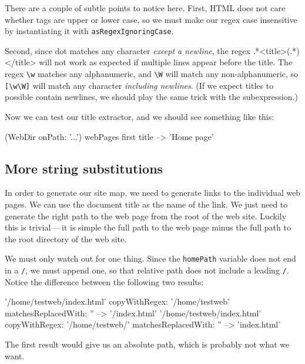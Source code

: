 \documentclass[10pt,twoside,chapterprefix=false]{scrbook}
\newcommand{\highlight}[1]{\textcolor{blue!65}{#1}}
\newcommand{\codecolor}{\color{blue!65}}
\newcommand{\asPict}[1]{%
	{\Large\highlight{#1}}}
\newcommand{\AttentionPlease}[1]{%
	{\reversemarginpar
		\marginnote{\asPict{!}}}
	\marginnote{\highlight{#1}}}
\renewcommand{\ct}{\lstinline[mathescape=false,basicstyle={\sffamily\upshape}]}
\renewcommand{\lct}[1]{{\codecolor\textsf{\textup{#1}}}}
\begin{document}
There are a couple of subtle points to notice here.\AttentionPlease{make regex case insensitive for HTML tags}
First, HTML does not care whether tags are upper or lower case, so we
must make our regex case insensitive by instantiating it with
\ct{asRegexIgnoringCase}.

Second, since dot\AttentionPlease{dot does not match newlines} matches any character
\emph{except a newline}, the regex \mbox{\lct{.*<title>(.*)</title>}}
will not work as expected if multiple lines appear before the title. The
regex \ct{\w} matches any alphanumeric, and \ct{\W} will match any
non-alphanumeric, so \ct{[\w\W]} will match any character
\emph{including newlines}. (If we expect titles to possible contain
newlines, we should play the same trick with the subexpression.)

Now we can test our title extractor, and we should see something like this:

\begin{ToSh-code}{}
(WebDir onPath: '...') webPages first title --> 'Home page'
\end{ToSh-code}

\subsection{More string substitutions}

In order to generate our site map, we need to generate links to the individual web pages.
We can use the document title as the name of the link.  We just need to generate the right path to the web page from the root of the web site.
Luckily this is trivial\,---\,it is simple the full path to the web page minus the full path to the root directory of the web site.

We must only watch out for one thing.  Since the \ct{homePath} variable does not end in a \ct{/}, we must append one, so that relative path does not include a leading \ct{/}. Notice the difference between the following two results:

\begin{ToSh-code}{}
'/home/testweb/index.html' copyWithRegex: '/home/testweb' matchesReplacedWith: '' --> '/index.html'
'/home/testweb/index.html' copyWithRegex: '/home/testweb/' matchesReplacedWith: '' -->  'index.html'
\end{ToSh-code}

The first result would give us an absolute path, which is probably not what we want.
\end{document}
